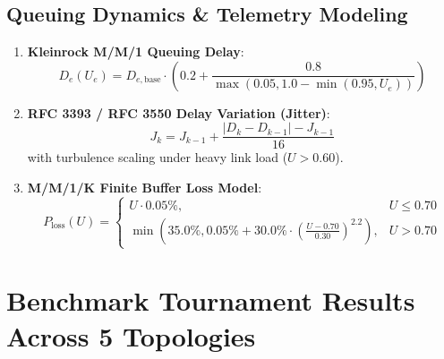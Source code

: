 \documentclass[11pt,a4paper]{article}
\begin{document}
\subsection{Queuing Dynamics \& Telemetry Modeling}
\begin{enumerate}[leftmargin=*]
    \item \textbf{Kleinrock M/M/1 Queuing Delay}:
    \begin{equation}
        D_e(U_e) = D_{e, \text{base}} \cdot \left( 0.2 + \frac{0.8}{\max(0.05, 1.0 - \min(0.95, U_e))} \right)
    \end{equation}
    \item \textbf{RFC 3393 / RFC 3550 Delay Variation (Jitter)}:
    \begin{equation}
        J_k = J_{k-1} + \frac{|D_k - D_{k-1}| - J_{k-1}}{16}
    \end{equation}
    with turbulence scaling under heavy link load ($U > 0.60$).
    \item \textbf{M/M/1/K Finite Buffer Loss Model}:
    \begin{equation}
        P_{\text{loss}}(U) = 
        \begin{cases}
            U \cdot 0.05\%, & U \le 0.70 \\
            \min\left(35.0\%, 0.05\% + 30.0\% \cdot \left(\frac{U - 0.70}{0.30}\right)^{2.2}\right), & U > 0.70
        \end{cases}
    \end{equation}
\end{enumerate}

\section{Benchmark Tournament Results Across 5 Topologies}
\end{document}
